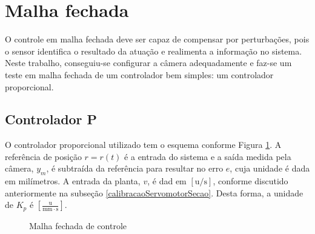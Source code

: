 \section{Malha fechada\label{malhafechadaSection}}
O controle em malha fechada deve ser capaz de compensar por perturbações, pois o sensor identifica o resultado da atuação e realimenta a informação no sistema. Neste trabalho, conseguiu-se configurar a câmera adequadamente e faz-se um teste em malha fechada de um controlador bem simples: um controlador proporcional.

\subsection{Controlador P}

O controlador proporcional utilizado tem o esquema conforme Figura \ref{mfechadaP}. A referência de posição $r = r(t)$ é a entrada do sistema e a saída medida pela câmera, $y_m$, é subtraída da referência para resultar no erro $e$, cuja unidade é dada em milímetros. A entrada da planta, $v$, é dad em $[\mathrm{u}/\mathrm{s}]$, conforme discutido anteriormente na subseção \ref{calibracaoServomotorSecao}. Desta forma, a unidade de $K_p$ é $\left[\frac{\mathrm{u}}{\mathrm{mm}\cdot\mathrm{s}}\right]$.

\begin{figure}[!ht]
\centering
{}
\caption{Malha fechada de controle\label{mfechadaP}}
\end{figure}

